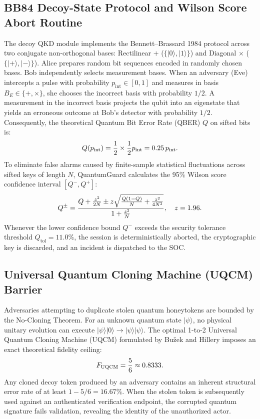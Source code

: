 \documentclass[journal,10pt]{IEEEtran}
\makeatletter
\let\orig@label\label
\def\label#1{%
  \orig@label{#1}%
  \pdfdest name{ref.#1} fith\relax
}
\makeatother
\begin{document}
\subsection{BB84 Decoy-State Protocol and Wilson Score Abort Routine}
The decoy QKD module implements the Bennett--Brassard 1984 protocol across two conjugate non-orthogonal bases: Rectilinear $+$ ($\{|0\rangle, |1\rangle\}$) and Diagonal $\times$ ($\{|+\rangle, |-\rangle\}$). Alice prepares random bit sequences encoded in randomly chosen bases. Bob independently selects measurement bases. When an adversary (Eve) intercepts a pulse with probability $p_{\mathrm{int}} \in [0, 1]$ and measures in basis $B_E \in \{+, \times\}$, she chooses the incorrect basis with probability $1/2$. A measurement in the incorrect basis projects the qubit into an eigenstate that yields an erroneous outcome at Bob's detector with probability $1/2$. Consequently, the theoretical Quantum Bit Error Rate (QBER) $Q$ on sifted bits is:
\begin{equation}
  Q(p_{\mathrm{int}}) = \frac{1}{2} \times \frac{1}{2} p_{\mathrm{int}} = 0.25\, p_{\mathrm{int}}.
  \label{eq:qber_formula}
\end{equation}
To eliminate false alarms caused by finite-sample statistical fluctuations across sifted keys of length $N$, QuantumGuard calculates the 95\% Wilson score confidence interval $[Q^-, Q^+]$:
\begin{equation}
  Q^{\pm} = \frac{Q + \frac{z^2}{2N} \pm z\sqrt{\frac{Q(1-Q)}{N} + \frac{z^2}{4N^2}}}{1 + \frac{z^2}{N}}, \quad z = 1.96.
  \label{eq:wilson_score}
\end{equation}
Whenever the lower confidence bound $Q^-$ exceeds the security tolerance threshold $Q_{\mathrm{tol}} = 11.0\%$, the session is deterministically aborted, the cryptographic key is discarded, and an incident is dispatched to the SOC.

\subsection{Universal Quantum Cloning Machine (UQCM) Barrier}
Adversaries attempting to duplicate stolen quantum honeytokens are bounded by the No-Cloning Theorem. For an unknown quantum state $|\psi\rangle$, no physical unitary evolution can execute $|\psi\rangle|0\rangle \to |\psi\rangle|\psi\rangle$. The optimal 1-to-2 Universal Quantum Cloning Machine (UQCM) formulated by Bu\v{z}ek and Hillery imposes an exact theoretical fidelity ceiling:
\begin{equation}
  F_{\mathrm{UQCM}} = \frac{5}{6} \approx 0.8333.
  \label{eq:uqcm_bound}
\end{equation}
Any cloned decoy token produced by an adversary contains an inherent structural error rate of at least $1 - 5/6 = 16.67\%$. When the stolen token is subsequently used against an authenticated verification endpoint, the corrupted quantum signature fails validation, revealing the identity of the unauthorized actor.
\end{document}
